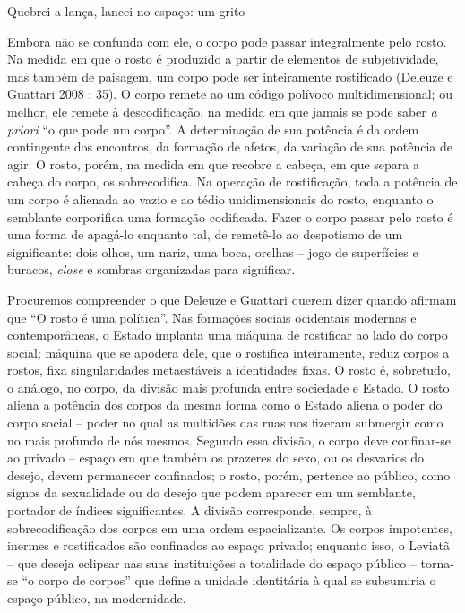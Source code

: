 Quebrei a lança, lancei no espaço: um grito

Embora não se confunda com ele, o corpo pode passar integralmente pelo
rosto. Na medida em que o rosto é produzido a partir de elementos de
subjetividade, mas também de paisagem, um corpo pode ser inteiramente
rostificado (Deleuze e Guattari 2008 : 35). O corpo remete ao um código
polívoco multidimensional; ou melhor, ele remete à descodificação, na
medida em que jamais se pode saber \emph{a priori} ``o que pode um
corpo''. A determinação de sua potência é da ordem contingente dos
encontros, da formação de afetos, da variação de sua potência de agir. O
rosto, porém, na medida em que recobre a cabeça, em que separa a cabeça
do corpo, os sobrecodifica. Na operação de rostificação, toda a potência
de um corpo é alienada ao vazio e ao tédio unidimensionais do rosto,
enquanto o semblante corporifica uma formação codificada. Fazer o corpo
passar pelo rosto é uma forma de apagá-lo enquanto tal, de remetê-lo ao
despotismo de um significante: dois olhos, um nariz, uma boca, orelhas
-- jogo de superfícies e buracos, \emph{close} e sombras organizadas
para significar.

Procuremos compreender o que Deleuze e Guattari querem dizer quando
afirmam que ``O rosto é uma política''. Nas formações sociais ocidentais
modernas e contemporâneas, o Estado implanta uma máquina de rostificar
ao lado do corpo social; máquina que se apodera dele, que o rostifica
inteiramente, reduz corpos a rostos, fixa singularidades metaestáveis a
identidades fixas. O rosto é, sobretudo, o análogo, no corpo, da divisão
mais profunda entre sociedade e Estado. O rosto aliena a potência dos
corpos da mesma forma como o Estado aliena o poder do corpo social --
poder no qual as multidões das ruas nos fizeram submergir como no mais
profundo de nós mesmos. Segundo essa divisão, o corpo deve confinar-se
ao privado -- espaço em que também os prazeres do sexo, ou os desvarios
do desejo, devem permanecer confinados; o rosto, porém, pertence ao
público, como signos da sexualidade ou do desejo que podem aparecer em
um semblante, portador de índices significantes. A divisão corresponde,
sempre, à sobrecodificação dos corpos em uma ordem espacializante. Os
corpos impotentes, inermes e rostificados são confinados ao espaço
privado; enquanto isso, o Leviatã -- que deseja eclipsar nas suas
instituições a totalidade do espaço público -- torna-se ``o corpo de
corpos'' que define a unidade identitária à qual se subsumiria o espaço
público, na modernidade.


